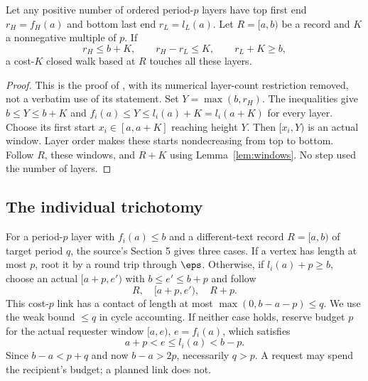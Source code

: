 \begin{lemma}\label{lem:collective}
Let any positive number of ordered period-$p$ layers have top first
end $r_H=f_H(a)$ and bottom last end $r_L=l_L(a)$.
Let $R=[a,b)$ be a record and $K$ a nonnegative multiple of $p$.
If
\begin{equation}\label{eq:collective}
r_H\le b+K,\qquad r_H-r_L\le K,\qquad r_L+K\ge b,
\end{equation}
a cost-$K$ closed walk based at $R$ touches all these layers.
\end{lemma}
\begin{proof}
This is the proof of , with its numerical
layer-count restriction removed, not a verbatim use of its statement.
Set $Y=\max(b,r_H)$. The inequalities give $b\le Y\le b+K$ and
$f_i(a)\le Y\le l_i(a)+K=l_i(a+K)$ for every layer.
Choose its first start $x_i\in[a,a+K]$ reaching height $Y$.
Then $[x_i,Y)$ is an actual window. Layer order makes these starts
nondecreasing from top to bottom. Follow $R$, these windows, and $R+K$
using Lemma~\ref{lem:windows}. No step used the number of layers.
\end{proof}

\subsection{The individual trichotomy}\label{sec:individual}
For a period-$p$ layer with $f_i(a)\le b$ and a different-text record
$R=[a,b)$ of target period $q$, the source's Section 5 gives three cases.
If a vertex has length at most $p$, root it by a round trip through
$\eps$. Otherwise, if $l_i(a)+p\ge b$, choose an actual
$[a+p,e')$ with $b\le e'\le b+p$ and follow
\begin{equation}\label{eq:individual}
R,\quad[a+p,e'),\quad R+p.
\end{equation}
This cost-$p$ link has a contact of length at most
$\max(0,b-a-p)\le q$. We use the weak bound $\le q$ in cycle accounting.
If neither case holds, reserve budget $p$ for the actual requester
window $[a,e)$, $e=f_i(a)$, which satisfies
\begin{equation}\label{eq:request}
a+p<e\le l_i(a)<b-p.
\end{equation}
Since $b-a<p+q$ and now $b-a>2p$, necessarily $q>p$.
A request may spend the recipient's budget; a planned link does not.

